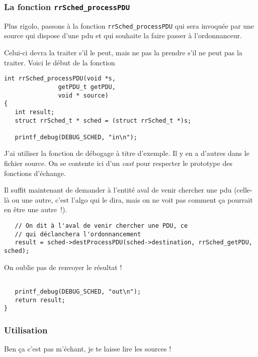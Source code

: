 %
\subsubsection{La fonction {\tt rrSched\_processPDU}}

   Plus rigolo, passons à la fonction {\tt rrSched\_processPDU} qui
sera invoquée par une source qui dispose d'une {\sc pdu} et qui
souhaite la faire passer à l'ordonnanceur.

   Celui-ci devra la traiter s'il le peut, mais ne pas la prendre s'il
ne peut pas la traiter. Voici le début de la fonction

\begin{verbatim}
int rrSched_processPDU(void *s,
		       getPDU_t getPDU,
		       void * source)
{
   int result;
   struct rrSched_t * sched = (struct rrSched_t *)s;

   printf_debug(DEBUG_SCHED, "in\n");
\end{verbatim}

   J'ai utiliser la fonction de débogage à titre d'exemple. Il y en a
d'autres dans le fichier source. On se contente ici d'un {\em cast}
pour respecter le prototype des fonctions d'échange.

   Il suffit maintenant de demander à l'entité aval de venir chercher
une {\sc pdu} (celle-là ou une autre, c'est l'algo qui le dira,
mais on ne voit pas comment ça pourrait en être une autre~!).

\begin{verbatim}
   // On dit à l'aval de venir chercher une PDU, ce
   // qui déclanchera l'ordonnancement
   result = sched->destProcessPDU(sched->destination, rrSched_getPDU, sched);
\end{verbatim}

   On oublie pas de renvoyer le résultat !

\begin{verbatim}

   printf_debug(DEBUG_SCHED, "out\n");
   return result;
}
\end{verbatim}

%
\subsubsection{Utilisation}

   Ben ça c'est pas m'échant, je te laisse lire les sources !

